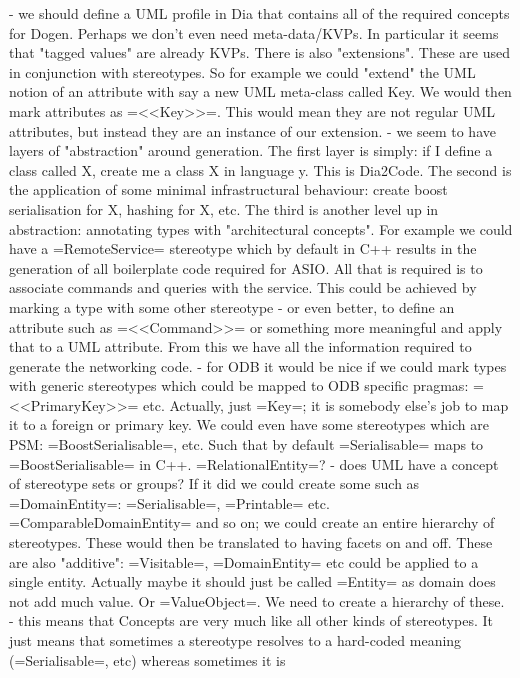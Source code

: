\documentclass{book}
\begin{document}
- we should define a UML profile in Dia that contains all of the
  required concepts for Dogen. Perhaps we don't even need
  meta-data/KVPs. In particular it seems that "tagged values" are
  already KVPs. There is also "extensions". These are used in
  conjunction with stereotypes. So for example we could "extend" the
  UML notion of an attribute with say a new UML meta-class called
  Key. We would then mark attributes as =<<Key>>=. This would mean
  they are not regular UML attributes, but instead they are an
  instance of our extension.
- we seem to have layers of "abstraction" around generation. The first
  layer is simply: if I define a class called X, create me a class X
  in language y. This is Dia2Code. The second is the application of
  some minimal infrastructural behaviour: create boost serialisation
  for X, hashing for X, etc. The third is another level up in
  abstraction: annotating types with "architectural concepts". For
  example we could have a =RemoteService= stereotype which by default
  in C++ results in the generation of all boilerplate code required
  for ASIO. All that is required is to associate commands and queries
  with the service. This could be achieved by marking a type with some
  other stereotype - or even better, to define an attribute such as
  =<<Command>>= or something more meaningful and apply that to a UML
  attribute. From this we have all the information required to
  generate the networking code.
- for ODB it would be nice if we could mark types with generic
  stereotypes which could be mapped to ODB specific pragmas:
  =<<PrimaryKey>>= etc. Actually, just =Key=; it is somebody else's
  job to map it to a foreign or primary key. We could even have some
  stereotypes which are PSM: =BoostSerialisable=, etc. Such that by
  default =Serialisable= maps to =BoostSerialisable= in
  C++. =RelationalEntity=?
- does UML have a concept of stereotype sets or groups? If it did we
  could create some such as =DomainEntity=: =Serialisable=,
  =Printable= etc. =ComparableDomainEntity= and so on; we could create
  an entire hierarchy of stereotypes. These would then be translated
  to having facets on and off. These are also "additive": =Visitable=,
  =DomainEntity= etc could be applied to a single entity. Actually
  maybe it should just be called =Entity= as domain does not add much
  value. Or =ValueObject=. We need to create a hierarchy of these.
- this means that Concepts are very much like all other kinds of
  stereotypes. It just means that sometimes a stereotype resolves to a
  hard-coded meaning (=Serialisable=, etc) whereas sometimes it is
\end{document}
